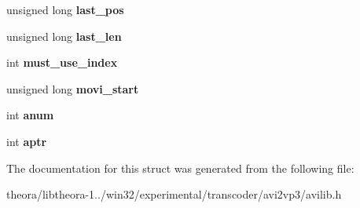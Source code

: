 \begin{DoxyCompactItemize}
\item 
\hypertarget{structavi__t_ac37b6f46a1664dd0242e90f6ba429e64}{unsigned long {\bfseries last\+\_\+pos}}\label{structavi__t_ac37b6f46a1664dd0242e90f6ba429e64}

\item 
\hypertarget{structavi__t_a6d4ab49e2a30247adb920fa29d2c47f3}{unsigned long {\bfseries last\+\_\+len}}\label{structavi__t_a6d4ab49e2a30247adb920fa29d2c47f3}

\item 
\hypertarget{structavi__t_a475bcc0b7e02d0903c7c8cb0cc6182bc}{int {\bfseries must\+\_\+use\+\_\+index}}\label{structavi__t_a475bcc0b7e02d0903c7c8cb0cc6182bc}

\item 
\hypertarget{structavi__t_a0c65d2659785e839f3e9b0d6ae7452f2}{unsigned long {\bfseries movi\+\_\+start}}\label{structavi__t_a0c65d2659785e839f3e9b0d6ae7452f2}

\item 
\hypertarget{structavi__t_ad35bf92cb5d757666b5b0192e301393d}{int {\bfseries anum}}\label{structavi__t_ad35bf92cb5d757666b5b0192e301393d}

\item 
\hypertarget{structavi__t_ae64e23df49815cae83fe06d3a3b39ce7}{int {\bfseries aptr}}\label{structavi__t_ae64e23df49815cae83fe06d3a3b39ce7}

\end{DoxyCompactItemize}


The documentation for this struct was generated from the following file\+:\begin{DoxyCompactItemize}
\item 
theora/libtheora-\/1../win32/experimental/transcoder/avi2vp3/avilib.\+h\end{DoxyCompactItemize}
